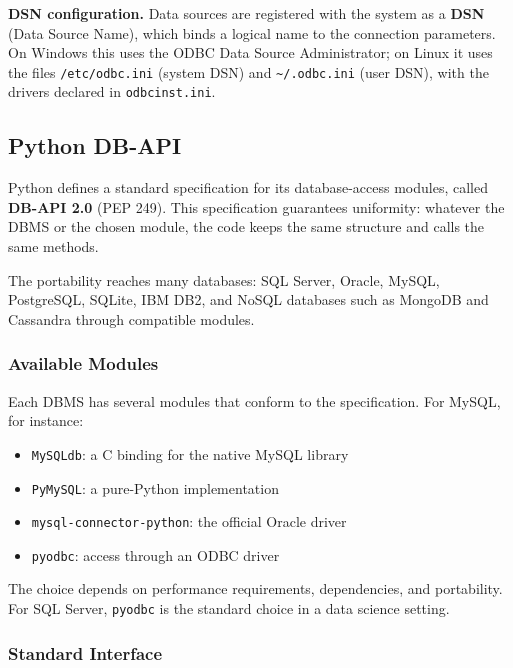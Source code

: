 \begin{notebox}
\textbf{DSN configuration.}
Data sources are registered with the system as a \textbf{DSN} (Data Source Name), which binds a logical name to the connection parameters. On Windows this uses the ODBC Data Source Administrator; on Linux it uses the files \texttt{/etc/odbc.ini} (system DSN) and \texttt{\textasciitilde/.odbc.ini} (user DSN), with the drivers declared in \texttt{odbcinst.ini}.
\end{notebox}

\subsection{Python DB-API}
\label{sec:python-dbapi}

Python defines a standard specification for its database-access modules, called \textbf{DB-API 2.0} (PEP 249). This specification guarantees uniformity: whatever the DBMS or the chosen module, the code keeps the same structure and calls the same methods.

The portability reaches many databases: SQL Server, Oracle, MySQL, PostgreSQL, SQLite, IBM DB2, and NoSQL databases such as MongoDB and Cassandra through compatible modules.

\subsubsection{Available Modules}
\label{subsec:dbapi-modules}

Each DBMS has several modules that conform to the specification. For MySQL, for instance:

\begin{itemize}
    \item \texttt{MySQLdb}: a C binding for the native MySQL library
    \item \texttt{PyMySQL}: a pure-Python implementation
    \item \texttt{mysql-connector-python}: the official Oracle driver
    \item \texttt{pyodbc}: access through an ODBC driver
\end{itemize}

The choice depends on performance requirements, dependencies, and portability. For SQL Server, \texttt{pyodbc} is the standard choice in a data science setting.

\subsubsection{Standard Interface}
\label{subsec:dbapi-interface}

